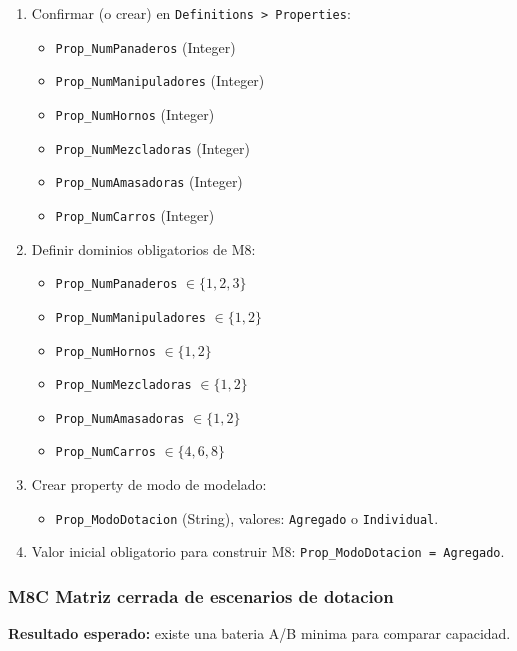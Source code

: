 \documentclass[11pt]{article}
\newcommand{\simio}[1]{\texttt{#1}}
\newcommand{\state}[1]{\texttt{#1}}
\begin{document}
\begin{enumerate}
  \item Confirmar (o crear) en \simio{Definitions > Properties}:
  \begin{itemize}
    \item \state{Prop\_NumPanaderos} (Integer)
    \item \state{Prop\_NumManipuladores} (Integer)
    \item \state{Prop\_NumHornos} (Integer)
    \item \state{Prop\_NumMezcladoras} (Integer)
    \item \state{Prop\_NumAmasadoras} (Integer)
    \item \state{Prop\_NumCarros} (Integer)
  \end{itemize}
  \item Definir dominios obligatorios de M8:
  \begin{itemize}
    \item \state{Prop\_NumPanaderos} \(\in \{1,2,3\}\)
    \item \state{Prop\_NumManipuladores} \(\in \{1,2\}\)
    \item \state{Prop\_NumHornos} \(\in \{1,2\}\)
    \item \state{Prop\_NumMezcladoras} \(\in \{1,2\}\)
    \item \state{Prop\_NumAmasadoras} \(\in \{1,2\}\)
    \item \state{Prop\_NumCarros} \(\in \{4,6,8\}\)
  \end{itemize}
  \item Crear property de modo de modelado:
  \begin{itemize}
    \item \state{Prop\_ModoDotacion} (String), valores: \simio{Agregado} o \simio{Individual}.
  \end{itemize}
  \item Valor inicial obligatorio para construir M8: \state{Prop\_ModoDotacion = Agregado}.
\end{enumerate}

\subsubsection{M8C Matriz cerrada de escenarios de dotacion}
\textbf{Resultado esperado:} existe una bateria A/B minima para comparar capacidad.
\end{document}
